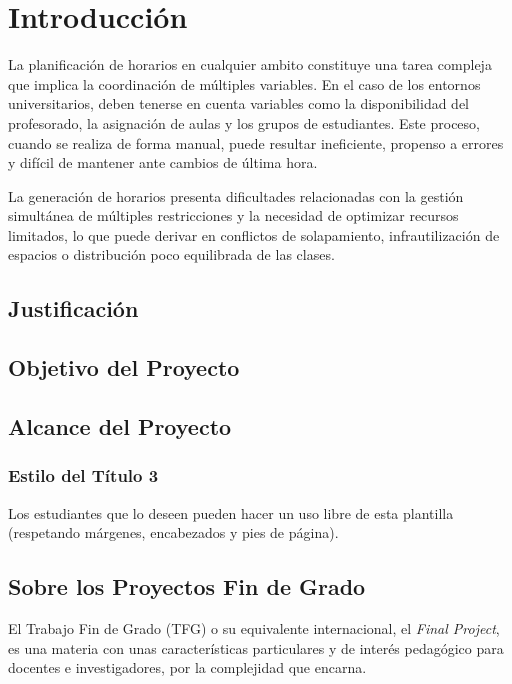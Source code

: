 \chapter{Introducción}

La planificación de horarios en cualquier ambito constituye una tarea compleja que implica la coordinación de múltiples variables. En el caso de los entornos universitarios, deben tenerse en cuenta variables como la disponibilidad del profesorado, la asignación de aulas y los grupos de estudiantes. Este proceso, cuando se realiza de forma manual, puede resultar ineficiente, propenso a errores y difícil de mantener ante cambios de última hora.

La generación de horarios presenta dificultades relacionadas con la gestión simultánea de múltiples restricciones y la necesidad de optimizar recursos limitados, lo que puede derivar en conflictos de solapamiento, infrautilización de espacios o distribución poco equilibrada de las clases.

\section{Justificación}

\section{Objetivo del Proyecto}

\section{Alcance del Proyecto}

\subsection{Estilo del Título 3}

Los estudiantes que lo deseen pueden hacer un uso libre de esta plantilla (respetando márgenes, encabezados y pies de página).

\section{Sobre los Proyectos Fin de Grado}

El Trabajo Fin de Grado (TFG) o su equivalente internacional, el \textit{Final Project}, es una materia con unas características particulares y de interés pedagógico para docentes e investigadores, por la complejidad que encarna. 

